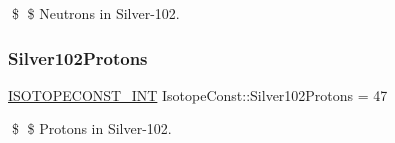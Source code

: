 \$ \$ Neutrons in Silver-\/102. \mbox{\label{group___isotope_const-_silver-_ag102_gab89e34be6c6f1ffc5efbb43607a42d96}} 
\subsubsection{\texorpdfstring{Silver102\+Protons}{Silver102Protons}}
{\footnotesize\ttfamily \mbox{\hyperlink{group___isotope_const-_macros_ga5f18360b3e99483a35c32d789e62621c}{I\+S\+O\+T\+O\+P\+E\+C\+O\+N\+S\+T\+\_\+\+I\+NT}} Isotope\+Const\+::\+Silver102\+Protons = 47}

\$ \$ Protons in Silver-\/102. 